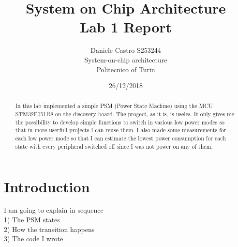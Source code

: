 \documentclass[peerreview]{IEEEtran}
\begin{document}
\title{System on Chip Architecture \\ Lab 1 Report}


\author{Daniele Castro S253244\\
System-on-chip architecture\\
Politecnico of Turin\\
}
\date{26/12/2018}

\maketitle
\tableofcontents
\listoffigures

\IEEEpeerreviewmaketitle
\begin{abstract}
In this lab implemented a simple PSM (Power State Machine) using the MCU STM32F051R8 on the discovery board. The progect, as it is, is useles. It only gives me the possibility to develop simple functions to switch in various low power modes so that in more userfull projects I can reuse them. I also made some measurements for each low power mode so that I can estimate the lowest power consumption for each state with every peripheral switched off since I was not power on any of them.
\end{abstract}
\section{Introduction}
I am going to explain in sequence\\
1) The PSM states\\
2) How the transition happens\\
3) The code I wrote
\end{document}

